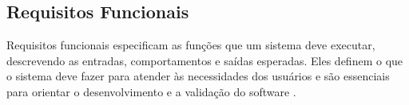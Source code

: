 {    %
    
    
    
    \subsection{Requisitos Funcionais}
    Requisitos funcionais especificam as funções que um sistema deve executar, descrevendo as entradas, comportamentos e saídas esperadas. Eles definem o que o sistema deve fazer para atender às necessidades dos usuários e são essenciais para orientar o desenvolvimento e a validação do software \citep{pressman2021engenharia}.
    
}

